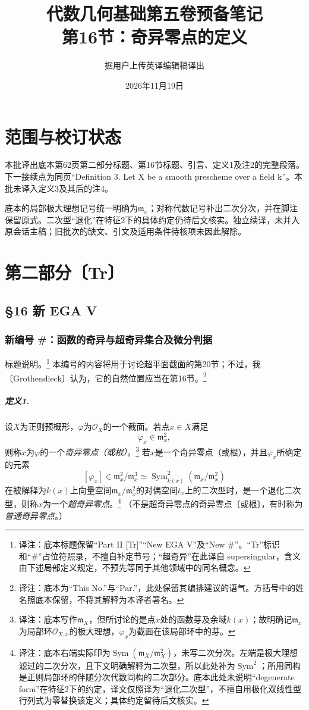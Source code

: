 \documentclass[openany,fontset=fandol]{ctexbook}
\newcommand{\note}[1]{\unskip\nobreak\footnote{译注：#1}}
\begin{document}
\title{代数几何基础第五卷预备笔记\\第16节：奇异零点的定义}
\author{据用户上传英译编辑稿译出}
\date{2026年11月19日}
\maketitle
\chapter*{范围与校订状态}
本批译出底本第62页第二部分标题、第16节标题、引言、定义1及注2的完整段落。下一接续点为同页“Definition 3. Let X be a smooth prescheme over a field k”。本批未译入定义3及其后的注4。

底本的局部极大理想记号统一明确为$\mathfrak m_x$；对称代数记号补出二次分次，并在脚注保留原式。二次型“退化”在特征2下的具体约定仍待后文核实。独立续译，未并入原会话主稿；旧批次的缺文、引文及适用条件待核项未因此解除。
\chapter*{第二部分〔Tr〕}
\section*{§16 新 EGA V}
\subsection*{新编号 \#：函数的奇异与超奇异集合及微分判据}
标题说明。\note{底本标题保留“Part II [Tr]”“New EGA V”及“New \#”。“Tr”标识和“\#”占位符照录，不擅自补定节号；“超奇异”在此译自 supersingular，含义由下述局部定义规定，不预先等同于其他领域中的同名概念。}
本编号的内容将用于讨论超平面截面的第20节；不过，我〔Grothendieck〕认为，它的自然位置应当在第16节。\note{底本为“This No.”与“Par.”，此处保留其编排建议的语气。方括号中的姓名照底本保留，不将其解释为本译者署名。}

\paragraph{定义1.}
设$X$为正则预概形，$\varphi$为$\mathcal O_X$的一个截面。若点$x\in X$满足
\[
\varphi_x\in\mathfrak m_x^2,
\]
则称$x$为$\varphi$的一个\emph{奇异零点（或根）}。\note{底本写作$\mathfrak m_X$，但所讨论的是点$x$处的函数芽及余域$k(x)$；故明确记$\mathfrak m_x$为局部环$\mathcal O_{X,x}$的极大理想，$\varphi_x$为截面在该局部环中的芽。}
若$x$是一个奇异零点（或根），并且$\varphi_x$所确定的元素
\[
[\varphi_x]\in\mathfrak m_x^2/\mathfrak m_x^3
\simeq\operatorname{Sym}^2_{k(x)}(\mathfrak m_x/\mathfrak m_x^2)
\]
在被解释为$k(x)$上向量空间$\mathfrak m_x/\mathfrak m_x^2$的对偶空间$t_x$上的二次型时，是一个退化二次型，则称$x$为一个\emph{超奇异零点}。\note{底本右端实际印为$\operatorname{Sym}(\mathfrak m_X/\mathfrak m_X^2)$，未写二次分次。左端是极大理想滤过的二次分次，且下文明确解释为二次型，所以此处补为$\operatorname{Sym}^2$；所用同构是正则局部环的伴随分次代数同构的二次部分。底本此处未说明“degenerate form”在特征2下的约定，译文仅照译为“退化二次型”，不擅自用极化双线性型行列式为零替换该定义；具体约定留待后文核实。}
（不是超奇异零点的奇异零点〔或根〕，有时称为\emph{普通奇异零点}。）
\end{document}

